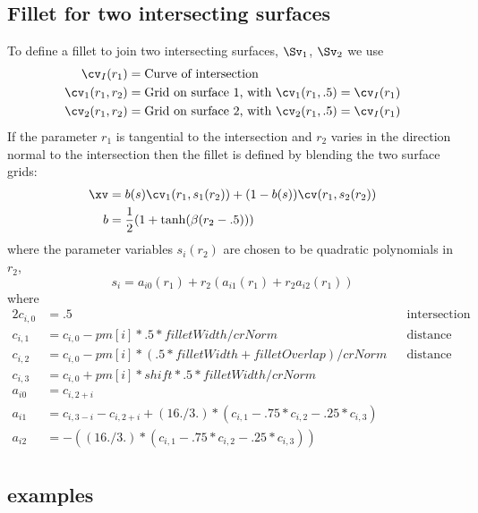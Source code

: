 \subsection{Fillet for two intersecting surfaces}

To define a fillet to join two intersecting surfaces, $\Sv_1$, $\Sv_2$  we use 
\begin{align*}
   \cv_I(r_1) & = \mbox{Curve of intersection} \\
    \cv_1(r_1,r_2) &= \mbox{Grid on surface 1, with $\cv_1(r_1,.5) = \cv_I(r_1)$} \\
    \cv_2(r_1,r_2) &= \mbox{Grid on surface 2, with $\cv_2(r_1,.5) = \cv_I(r_1)$}
\end{align*}
If the parameter $r_1$ is tangential to the intersection and $r_2$ varies in the direction
normal to the intersection then the fillet is defined by blending the two surface grids:
\begin{align*}
   \xv & = b(s) \cv_1(r_1,s_1(r_2)) + (1-b(s)) \cv(r_1,s_2(r_2))   \\
   b &= {1\over2} ( 1+\tanh( \beta(r_2-.5) ) )
\end{align*}
where the parameter variables $s_i(r_2)$ are chosen to be quadratic polynomials in $r_2$,
\[
   s_i = a_{i0}(r_1) + r_2 ( a_{i1}(r_1) + r_2 a_{i2}(r_1) )
\]
where
\begin{alignat*}{2}
   c_{i,0} &=.5                                   && \mbox{intersection point} \\
   c_{i,1} &=c_{i,0}-pm[i]*.5*filletWidth/crNorm  && \mbox{distance from intersection point for c1} \\
   c_{i,2} &=c_{i,0}-pm[i]*(.5*filletWidth+filletOverlap)/crNorm && \mbox{distance from intersection point for c2} \\
   c_{i,3} &=c_{i,0}+pm[i]*shift*.5*filletWidth/crNorm   && \\
   a_{i0} &= c_{i,2+i}  && \\
   a_{i1} &= c_{i,3-i}-c_{i,2+i}+(16./3.)*(c_{i,1}-.75*c_{i,2}-.25*c_{i,3}) &&  \\
   a_{i2} &= -((16./3.)*(c_{i,1}-.75*c_{i,2}-.25*c_{i,3})) &&  \\
\end{alignat*}


\subsection{examples}

